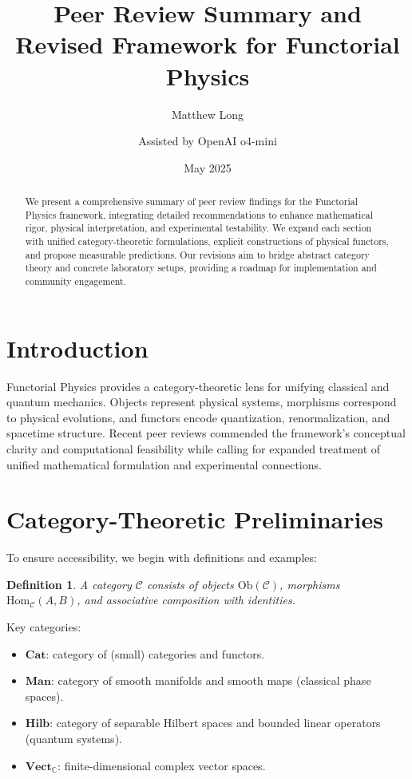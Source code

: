 \documentclass[11pt,a4paper]{article}
\title{Peer Review Summary and Revised Framework for Functorial Physics}
\author[1]{Matthew Long}
\author[2]{Assisted by OpenAI o4-mini}
\affil[1]{Yoneda AI, Magneton Labs}
\affil[2]{OpenAI Research}
\date{May 2025}
\newtheorem{definition}[theorem]{Definition}
\newcommand{\Cat}{\mathbf{Cat}}
\newcommand{\Hilb}{\mathbf{Hilb}}
\newcommand{\Man}{\mathbf{Man}}
\newcommand{\Vect}{\mathbf{Vect}}
\newcommand{\C}{\mathbb{C}}
\begin{document}
\maketitle

\begin{abstract}
We present a comprehensive summary of peer review findings for the Functorial Physics framework, integrating detailed recommendations to enhance mathematical rigor, physical interpretation, and experimental testability. We expand each section with unified category-theoretic formulations, explicit constructions of physical functors, and propose measurable predictions. Our revisions aim to bridge abstract category theory and concrete laboratory setups, providing a roadmap for implementation and community engagement.
\end{abstract}

\tableofcontents

\section{Introduction}
Functorial Physics provides a category-theoretic lens for unifying classical and quantum mechanics. Objects represent physical systems, morphisms correspond to physical evolutions, and functors encode quantization, renormalization, and spacetime structure. Recent peer reviews commended the framework's conceptual clarity and computational feasibility while calling for expanded treatment of unified mathematical formulation and experimental connections.

\section{Category-Theoretic Preliminaries}
To ensure accessibility, we begin with definitions and examples:
\begin{definition}
A \emph{category} $\mathcal{C}$ consists of objects $\mathrm{Ob}(\mathcal{C})$, morphisms $\mathrm{Hom}_{\mathcal{C}}(A,B)$, and associative composition with identities.
\end{definition}

Key categories:
\begin{itemize}
  \item $\Cat$: category of (small) categories and functors.
  \item $\Man$: category of smooth manifolds and smooth maps (classical phase spaces).
  \item $\Hilb$: category of separable Hilbert spaces and bounded linear operators (quantum systems).
  \item $\Vect_{\C}$: finite-dimensional complex vector spaces.
\end{itemize}
\end{document}
